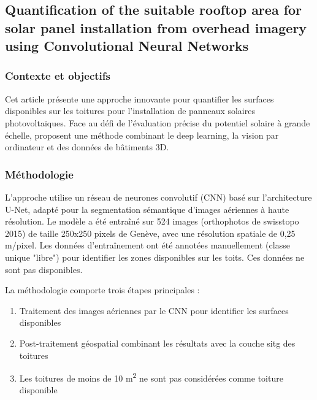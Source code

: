 {{{{%
\subsection{Quantification of the suitable rooftop area for solar panel installation from overhead imagery using Convolutional Neural Networks}
\label{subsec:castello_quantification_2021}

\subsubsection{Contexte et objectifs}
\par{Cet article \cite{castello_quantification_2021} présente une approche innovante pour quantifier les surfaces disponibles sur les toitures pour l'installation de panneaux solaires photovoltaïques. Face au défi de l'évaluation précise du potentiel solaire à grande échelle, \citeauthor{castello_quantification_2021} proposent une méthode combinant le deep learning, la vision par ordinateur et des données de bâtiments 3D.}

\subsubsection{Méthodologie}
\par{L'approche utilise un réseau de neurones convolutif (CNN) basé sur l'architecture U-Net, adapté pour la segmentation sémantique d'images aériennes à haute résolution. Le modèle a été entraîné sur 524 images (orthophotos de swisstopo 2015) de taille 250x250 pixels de Genève, avec une résolution spatiale de 0,25 m/pixel. Les données d'entraînement ont été annotées manuellement (classe unique "libre") pour identifier les zones disponibles sur les toits. Ces données ne sont pas disponibles.}

\par{La méthodologie comporte trois étapes principales :}
\begin{enumerate}
    \item Traitement des images aériennes par le CNN pour identifier les surfaces disponibles
    \item Post-traitement géospatial combinant les résultats avec la couche \acrshort{sitg} des toitures
    \item Les toitures de moins de 10 \si{\unit{\square\meter}} ne sont pas considérées comme toiture disponible
\end{enumerate}

}}}}

